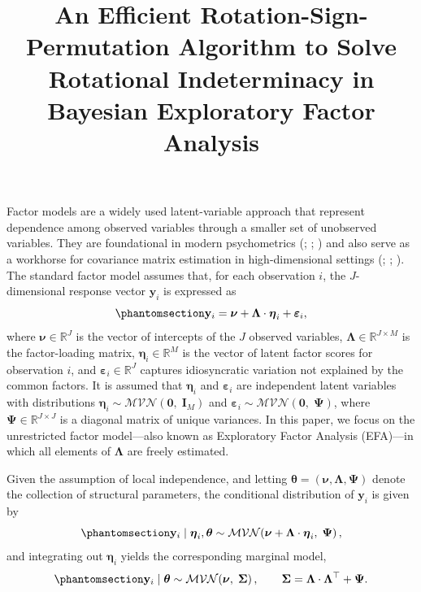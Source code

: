 \documentclass[
  man,
  longtable,
  nolmodern,
  notxfonts,
  notimes,
  colorlinks=true,linkcolor=blue,citecolor=blue,urlcolor=blue]{apa7}
\title{An Efficient Rotation-Sign-Permutation Algorithm to Solve
Rotational Indeterminacy in Bayesian Exploratory Factor Analysis}
\theoremstyle{plain}
\theoremstyle{plain}
\theoremstyle{remark}
\begin{document}
\maketitle




\setlength\LTleft{0pt}




Factor models are a widely used latent-variable approach that represent
dependence among observed variables through a smaller set of unobserved
variables. They are foundational in modern psychometrics
(;
;
) and also serve as
a workhorse for covariance matrix estimation in high-dimensional
settings (; ;
). The standard
factor model assumes that, for each observation \(i\), the
\(J\)-dimensional response vector \(\mathbf{y}_i\) is expressed as
\begin{equation}\phantomsection\label{eq-01}{
\mathbf{y}_i = \boldsymbol\nu + \mathbf\Lambda\cdot\boldsymbol\eta_{i} + \boldsymbol\varepsilon_{i},
}\end{equation} where \(\boldsymbol\nu\in\mathbb{R}^J\) is the vector of
intercepts of the \(J\) observed variables,
\(\mathbf\Lambda\in\mathbb{R}^{J\times M}\) is the factor-loading
matrix, \(\boldsymbol\eta_i\in\mathbb{R}^M\) is the vector of latent
factor scores for observation \(i\), and
\(\boldsymbol\varepsilon_i\in\mathbb{R}^J\) captures idiosyncratic
variation not explained by the common factors. It is assumed that
\(\boldsymbol\eta_i\) and \(\boldsymbol\varepsilon_i\) are independent
latent variables with distributions
\(\boldsymbol\eta_i\sim \mathcal{MVN}\left(\boldsymbol 0,\;\mathbf{I}_M\right)\)
and
\(\boldsymbol{\varepsilon}_i\sim\mathcal{MVN}\left(\boldsymbol 0,\;\mathbf\Psi\right)\),
where \(\mathbf\Psi\in\mathbb{R}^{J\times J}\) is a diagonal matrix of
unique variances. In this paper, we focus on the unrestricted factor
model---also known as Exploratory Factor Analysis (EFA)---in which all
elements of \(\mathbf\Lambda\) are freely estimated.

Given the assumption of local independence, and letting
\(\boldsymbol\theta = (\boldsymbol\nu, \mathbf\Lambda, \mathbf\Psi)\)
denote the collection of structural parameters, the conditional
distribution of \(\mathbf{y}_i\) is given by
\begin{equation}\phantomsection\label{eq-02}{
\mathbf{y}_i \mid \boldsymbol\eta_i, \boldsymbol\theta \sim \mathcal{MVN}\!\left(\boldsymbol\nu + \mathbf\Lambda \cdot\boldsymbol\eta_i,\;\mathbf\Psi\right), 
}\end{equation} and integrating out \(\boldsymbol\eta_i\) yields the
corresponding marginal model,
\begin{equation}\phantomsection\label{eq-03}{
\mathbf{y}_i \mid \boldsymbol\theta \sim \mathcal{MVN}\!\left(\boldsymbol\nu,\;\mathbf\Sigma\right),
\qquad
\mathbf\Sigma = \mathbf\Lambda\cdot\mathbf\Lambda^\top + \mathbf\Psi.
}\end{equation}
\end{document}

